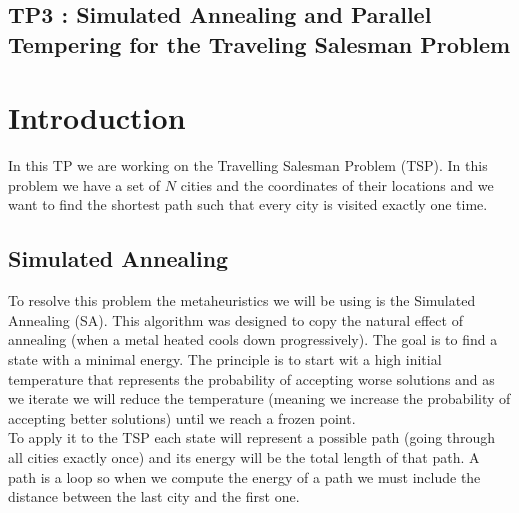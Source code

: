 \documentclass[14pt]
{article}
\begin{document}
\pagestyle{fancy}

\bigskip
\begin{center}
	\section*{\textbf{{\LARGE TP3 : Simulated Annealing and Parallel Tempering for the Traveling Salesman Problem}}}
\end{center}
\bigskip\bigskip\bigskip

\section{Introduction}
In this TP we are working on the Travelling Salesman Problem (TSP). In this problem we have a set of $N$ cities and the coordinates of their locations and we want to find the shortest path such that every city is visited exactly one time.

\subsection{Simulated Annealing}
To resolve this problem the metaheuristics we will be using is the Simulated Annealing (SA). This algorithm was designed to copy the natural effect of annealing (when a metal heated cools down progressively). The goal is to find a state with a minimal energy. The principle is to start wit a high initial temperature that represents the probability of accepting worse solutions and as we iterate we will reduce the temperature (meaning we increase the probability of accepting better solutions) until we reach a frozen point.\\
To apply it to the TSP each state will represent a possible path (going through all cities exactly once) and its energy will be the total length of that path. A path is a loop so when we compute the energy of a path we must include the distance between the last city and the first one.
\end{document}
